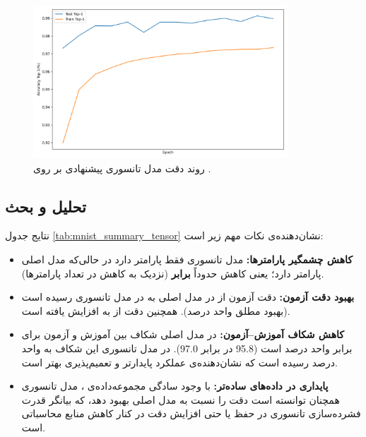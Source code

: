 \begin{figure}[ht]
	\centering
	\includegraphics[width=0.85\textwidth]{transformer_images/results/mnist_tensorized.png}
	\caption{روند دقت  مدل تانسوری پیشنهادی بر روی .}
	\label{fig:mnist_tensorized}
\end{figure}

\subsection{تحلیل و بحث}

نتایج جدول \ref{tab:mnist_summary_tensor} نشان‌دهنده‌ی نکات مهم زیر است:
\begin{itemize}
	\item \textbf{کاهش چشمگیر پارامترها:} مدل تانسوری فقط  پارامتر دارد در حالی‌که مدل اصلی  پارامتر دارد؛ یعنی کاهش حدوداً \textbf{ برابر} (نزدیک به \textbf{} کاهش در تعداد پارامترها).
	\item \textbf{بهبود دقت آزمون:} دقت  آزمون از \textbf{} در مدل اصلی به \textbf{} در مدل تانسوری رسیده است (بهبود مطلق \textbf{} واحد درصد). همچنین دقت  از \textbf{} به \textbf{} افزایش یافته است.
	\item \textbf{کاهش شکاف آموزش–آزمون:} در مدل اصلی شکاف بین آموزش و آزمون برای  برابر \textbf{} واحد درصد است (95.8 در برابر 97.0). در مدل تانسوری این شکاف به \textbf{} واحد درصد رسیده است که نشان‌دهنده‌ی عملکرد پایدارتر و تعمیم‌پذیری بهتر است.
	\item \textbf{پایداری در داده‌های ساده‌تر:} با وجود سادگی مجموعه‌داده‌ی ، مدل تانسوری همچنان توانسته است دقت را نسبت به مدل اصلی بهبود دهد، که بیانگر قدرت فشرده‌سازی تانسوری در حفظ یا حتی افزایش دقت در کنار کاهش منابع محاسباتی است.
\end{itemize}

